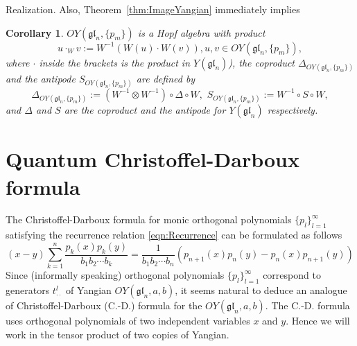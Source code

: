 \documentclass[10pt]{article}%
\numberwithin{equation}{section}
\newtheorem{cor}[thm]{Corollary}
\newtheorem{rem}[thm]{Remark}
\newcommand{\red}{\color{red}}
\newcommand{\gl}{{\mathfrak{gl}}}
\begin{document}
\begin{paragraph}{Realization.}
Also, Theorem~\ref{thm:ImageYangian} immediately implies
\begin{cor}
 $OY(\gl_n,\{p_m\})$ is a Hopf algebra with product
 \[
 u\cdot_W v:= W^{-1}(W(u)\cdot W(v)), u,v\in OY(\gl_n,\{p_m\}),
 \]
 where $\cdot$ inside the brackets is the product in $Y(\gl_n)$), the coproduct $\Delta_{OY(\gl_n,\{p_m\})}$ and the antipode $S_{OY(\gl_n,\{p_m\})}$ are defined by
 \[
 \Delta_{OY(\gl_n,\{p_m\})}:=(W^{-1}\otimes W^{-1})\circ \Delta\circ W, \,\, S_{OY(\gl_n,\{p_m\})}:= W^{-1}\circ S\circ W,
 \]
 and $\Delta$ and $S$ are the coproduct and the antipode for $Y(\gl_n)$ respectively.
\end{cor}
\end{paragraph}


\section{Quantum Christoffel-Darboux formula}

The Christoffel-Darboux formula  for monic orthogonal polynomials $\{p_l\}_{l=1}^{\infty}$  satisfying the recurrence relation \eqref{eqn:Recurrence} can be formulated as follows
\begin{equation}
    (x-y)\sum\limits_{k=1}^n\frac{p_k(x)p_k(y)}{b_1 b_2\cdots b_k}=\frac{1}{b_1 b_2\cdots b_n}\left(p_{n+1}(x)p_n(y)-p_{n}(x)p_{n+1}(y)\right)
\end{equation}
Since (informally speaking) orthogonal polynomials $\{p_l\}_{l=1}^{\infty}$ correspond to generators $t_{\cdot\cdot}^{l}$ of Yangian $OY(\gl_n,a,b)$, it seems natural to deduce an analogue of Christoffel-Darboux (C.-D.) formula for the $OY(\gl_n,a,b)$. The C.-D. formula uses orthogonal polynomials of two independent variables $x$ and $y$. Hence we will work in the tensor product of two copies of Yangian.
\end{document}

